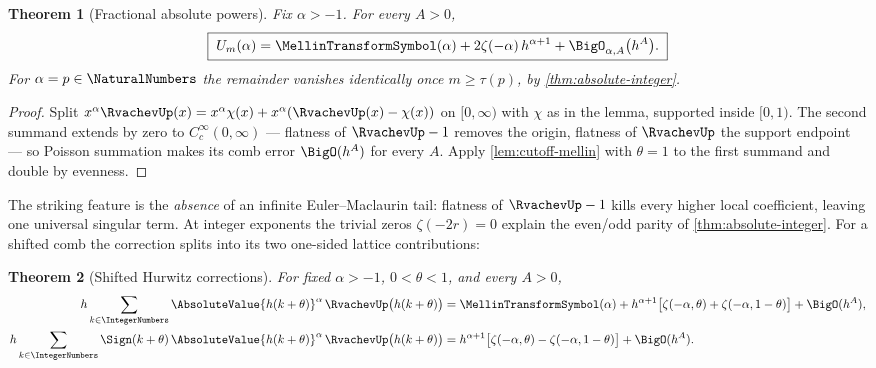 \documentclass[11pt,oneside]{article}
\numberwithin{equation}{section}
\newtheorem{theorem}{Theorem}[section]
\theoremstyle{definition}
\theoremstyle{remark}
\begin{document}
\begin{theorem}[Fractional absolute powers]
\label{thm:fractional-zeta}
Fix $\alpha>-1$.  For every $A>0$,
\begin{equation}
 \boxed{\;
 U_m(\alpha)
 =\MellinTransformSymbol(\alpha)
 +2\zeta(-\alpha)\,h^{\alpha+1}
 +\BigO_{\alpha,A}\bigl(h^{A}\bigr).
 \;}
 \label{eq:fractional-zeta}
\end{equation}
For $\alpha=p\in\NaturalNumbers$ the remainder vanishes identically once
$m\ge\tau(p)$, by \cref{thm:absolute-integer}.
\end{theorem}

\begin{proof}
Split $x^{\alpha}\RvachevUp(x)=x^{\alpha}\chi(x)
+x^{\alpha}(\RvachevUp(x)-\chi(x))$ on $[0,\infty)$ with $\chi$ as in the
lemma, supported inside $[0,1)$.  The second summand extends by zero
to $C_c^\infty(0,\infty)$ --- flatness of $\RvachevUp-1$ removes the origin,
flatness of $\RvachevUp$ the support endpoint --- so Poisson summation makes
its comb error $\BigO(h^{A})$ for every $A$.  Apply
\cref{lem:cutoff-mellin} with $\theta=1$ to the first summand and
double by evenness.
\end{proof}

The striking feature is the \emph{absence} of an infinite
Euler--Maclaurin tail: flatness of $\RvachevUp-1$ kills every higher local
coefficient, leaving one universal singular term.  At integer
exponents the trivial zeros $\zeta(-2r)=0$ explain the even/odd parity
of \cref{thm:absolute-integer}.  For a shifted comb the correction
splits into its two one-sided lattice contributions:

\begin{theorem}[Shifted Hurwitz corrections]
\label{thm:shifted-Hurwitz}
For fixed $\alpha>-1$, $0<\theta<1$, and every $A>0$,
\begin{align}
 h\sum_{k\in\IntegerNumbers}\AbsoluteValue{h(k+\theta)}^{\alpha}\,
 \RvachevUp\bigl(h(k+\theta)\bigr)
 &=\MellinTransformSymbol(\alpha)
 +h^{\alpha+1}\bigl[\zeta(-\alpha,\theta)+\zeta(-\alpha,1-\theta)\bigr]
 +\BigO(h^{A}),
 \label{eq:shifted-abs-Hurwitz}\\
 h\sum_{k\in\IntegerNumbers}\Sign(k+\theta)\,\AbsoluteValue{h(k+\theta)}^{\alpha}\,
 \RvachevUp\bigl(h(k+\theta)\bigr)
 &=h^{\alpha+1}\bigl[\zeta(-\alpha,\theta)-\zeta(-\alpha,1-\theta)\bigr]
 +\BigO(h^{A}).
 \label{eq:shifted-signed-Hurwitz}
\end{align}
\end{theorem}
\end{document}
